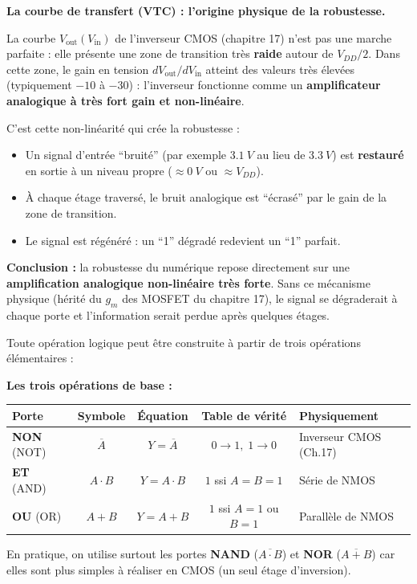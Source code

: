 \documentclass[12pt,a4paper,twoside]{book}
\begin{document}
\begin{formule}
\textbf{La courbe de transfert (VTC) : l'origine physique de la robustesse.}

La courbe $V_{\text{out}}(V_{\text{in}})$ de l'inverseur CMOS (chapitre 17) n'est pas une marche parfaite : elle présente une zone de transition très \textbf{raide} autour de $V_{DD}/2$. Dans cette zone, le gain en tension $dV_{\text{out}}/dV_{\text{in}}$ atteint des valeurs très élevées (typiquement $-10$ à $-30$) : l'inverseur fonctionne comme un \textbf{amplificateur analogique à très fort gain et non-linéaire}.

C'est cette non-linéarité qui crée la robustesse :
\begin{itemize}[nosep]
\item Un signal d'entrée ``bruité'' (par exemple $\SI{3.1}{V}$ au lieu de $\SI{3.3}{V}$) est \textbf{restauré} en sortie à un niveau propre ($\approx \SI{0}{V}$ ou $\approx V_{DD}$).
\item À chaque étage traversé, le bruit analogique est ``écrasé'' par le gain de la zone de transition.
\item Le signal est régénéré : un ``1'' dégradé redevient un ``1'' parfait.
\end{itemize}

\textbf{Conclusion :} la robustesse du numérique repose directement sur une \textbf{amplification analogique non-linéaire très forte}. Sans ce mécanisme physique (hérité du $g_m$ des MOSFET du chapitre 17), le signal se dégraderait à chaque porte et l'information serait perdue après quelques étages.
\end{formule}

Toute opération logique peut être construite à partir de trois opérations élémentaires :

\begin{formule}
\textbf{Les trois opérations de base :}

\begin{center}
\renewcommand{\arraystretch}{1.4}
\begin{tabular}{lcccp{5cm}}
\toprule
\textbf{Porte} & \textbf{Symbole} & \textbf{Équation} & \textbf{Table de vérité} & \textbf{Physiquement} \\
\midrule
\textbf{NON} (NOT) & $\overline{A}$ & $Y = \overline{A}$ & $0 \to 1,\; 1 \to 0$ & Inverseur CMOS (Ch.17) \\
\textbf{ET} (AND) & $A \cdot B$ & $Y = A \cdot B$ & $1$ ssi $A=B=1$ & Série de NMOS \\
\textbf{OU} (OR) & $A + B$ & $Y = A + B$ & $1$ ssi $A=1$ ou $B=1$ & Parallèle de NMOS \\
\bottomrule
\end{tabular}
\end{center}

En pratique, on utilise surtout les portes \textbf{NAND} ($\overline{A \cdot B}$) et \textbf{NOR} ($\overline{A+B}$) car elles sont plus simples à réaliser en CMOS (un seul étage d'inversion).
\end{formule}
\end{document}
